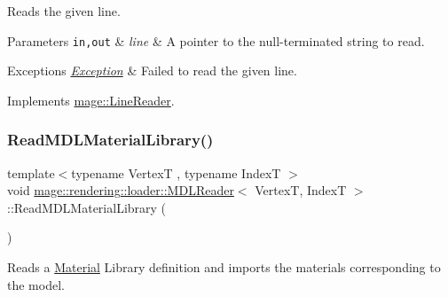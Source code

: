 Reads the given line.


\begin{DoxyParams}[1]{Parameters}
\mbox{\tt in,out}  & {\em line} & A pointer to the null-\/terminated string to read. \\
\hline
\end{DoxyParams}

\begin{DoxyExceptions}{Exceptions}
{\em \mbox{\hyperlink{classmage_1_1_exception}{Exception}}} & Failed to read the given line. \\
\hline
\end{DoxyExceptions}


Implements \mbox{\hyperlink{classmage_1_1_line_reader_ae50ac0637eddead37a7a9cca2a570072}{mage\+::\+Line\+Reader}}.

\mbox{\label{classmage_1_1rendering_1_1loader_1_1_m_d_l_reader_a40697c5c645e00ba6f4cc5cd28872b8f}} 
\subsubsection{\texorpdfstring{Read\+M\+D\+L\+Material\+Library()}{ReadMDLMaterialLibrary()}}
{\footnotesize\ttfamily template$<$typename VertexT , typename IndexT $>$ \\
void \mbox{\hyperlink{classmage_1_1rendering_1_1loader_1_1_m_d_l_reader}{mage\+::rendering\+::loader\+::\+M\+D\+L\+Reader}}$<$ VertexT, IndexT $>$\+::Read\+M\+D\+L\+Material\+Library (\begin{DoxyParamCaption}{ }\end{DoxyParamCaption})\hspace{0.3cm}{\ttfamily [private]}}

Reads a \mbox{\hyperlink{classmage_1_1rendering_1_1_material}{Material}} Library definition and imports the materials corresponding to the model.


